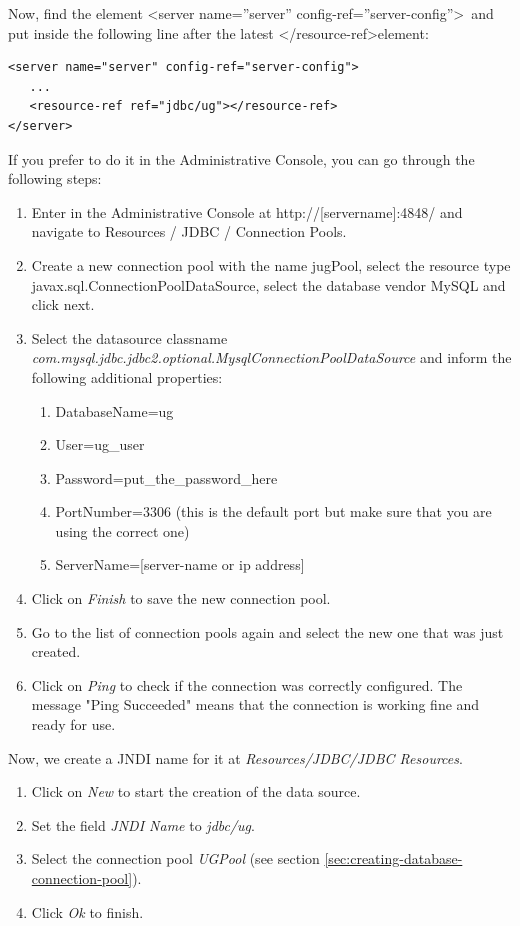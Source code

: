 \documentclass[envcountsame,envcountchap]{svmono}
\begin{document}
Now, find the element \textless server name=''server'' config-ref=''server-config''\textgreater \ and put inside the following line after the latest \textless /resource-ref\textgreater element:

\begin{verbatim}
<server name="server" config-ref="server-config">
   ...
   <resource-ref ref="jdbc/ug"></resource-ref>
</server>
\end{verbatim}

If you prefer to do it in the Administrative Console, you can go through the following steps:

\begin{enumerate}
\item  Enter in the Administrative Console at http://[servername]:4848/ and navigate to Resources / JDBC / Connection Pools.
\item Create a new connection pool with the name jugPool, select the resource type javax.sql.ConnectionPoolDataSource, select the database vendor MySQL and click next.
\item Select the datasource classname \\ \textit{com.mysql.jdbc.jdbc2.optional.MysqlConnectionPoolDataSource} and inform the following additional properties:
   \begin{enumerate}
   \item DatabaseName=ug
   \item User=ug\_user
   \item Password=put\_the\_password\_here
   \item PortNumber=3306 (this is the default port but make sure
   that you are using the correct one)
   \item ServerName=[server-name or ip address]
   \end{enumerate}
\item Click on \textit{Finish} to save the new connection pool.
\item Go to the list of connection pools again and select the new one that was just created.
\item Click on \textit{Ping} to check if the connection was correctly configured. The message "Ping Succeeded" means that the connection is working fine and ready for use.
\end{enumerate}

Now, we create a JNDI name for it at \textit{Resources/JDBC/JDBC Resources}.

\begin{enumerate}
\item Click on \textit{New} to start the creation of the data source.
\item Set the field \textit{JNDI Name} to \textit{jdbc/ug}.
\item Select the connection pool \textit{UGPool} (see section \ref{sec:creating-database-connection-pool}).
\item Click \textit{Ok} to finish.
\end{enumerate}
\end{document}
